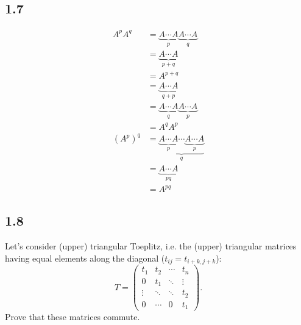 \subsection*{1.7}
\begin{solution}
  \begin{align*}
    A^pA^q
    & = \underbrace{A \cdots A}_{p} \underbrace{A \cdots A}_{q}\\
    & = \underbrace{A \cdots A}_{p+q}\\
    & = A^{p+q}\\
    & = \underbrace{A \cdots A}_{q+p}\\
    & = \underbrace{A \cdots A}_{q} \underbrace{A \cdots A}_{p}\\
    & = A^qA^p\\
    (A^p)^q
    & = \underbrace{\underbrace{A \cdots A}_{p} \cdots \underbrace{A \cdots A}_{p}}_q\\
    & = \underbrace{A \cdots A}_{pq}\\
    & = A^{pq}
  \end{align*}
\end{solution}

\subsection*{1.8}
Let's consider (upper) triangular Toeplitz,
i.e. the (upper) triangular matrices having equal elements
 along the diagonal ($t_{ij} = t_{i+k,j+k}$):
\[
  T =
  \begin{pmatrix}
    t_1 & t_2 & \cdots & t_n\\
    0   & t_1 & \ddots & \vdots\\
    \vdots & \ddots & \ddots & t_2\\
    0 & \cdots & 0 & t_1
  \end{pmatrix}.
\]
Prove that these matrices commute.

